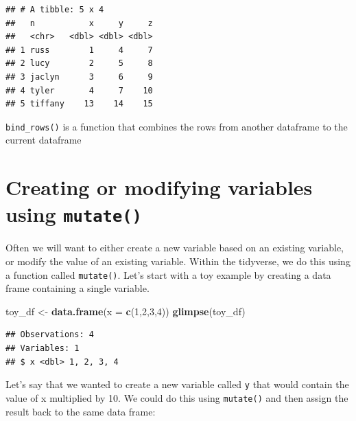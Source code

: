\documentclass[12pt,]{book}
\newenvironment{Shaded}{\begin{snugshade}}{\end{snugshade}}
\newcommand{\CommentTok}[1]{\textcolor[rgb]{0.56,0.35,0.01}{\textit{#1}}}
\newcommand{\DataTypeTok}[1]{\textcolor[rgb]{0.13,0.29,0.53}{#1}}
\newcommand{\DecValTok}[1]{\textcolor[rgb]{0.00,0.00,0.81}{#1}}
\newcommand{\KeywordTok}[1]{\textcolor[rgb]{0.13,0.29,0.53}{\textbf{#1}}}
\newcommand{\NormalTok}[1]{#1}
\newcommand{\OperatorTok}[1]{\textcolor[rgb]{0.81,0.36,0.00}{\textbf{#1}}}
\newcommand{\StringTok}[1]{\textcolor[rgb]{0.31,0.60,0.02}{#1}}
\begin{document}
\begin{verbatim}
## # A tibble: 5 x 4
##   n           x     y     z
##   <chr>   <dbl> <dbl> <dbl>
## 1 russ        1     4     7
## 2 lucy        2     5     8
## 3 jaclyn      3     6     9
## 4 tyler       4     7    10
## 5 tiffany    13    14    15
\end{verbatim}

\texttt{bind\_rows()} is a function that combines the rows from another dataframe to the current dataframe

\hypertarget{creating-or-modifying-variables-using-mutate}{%
\section{\texorpdfstring{Creating or modifying variables using \texttt{mutate()}}{Creating or modifying variables using mutate()}}\label{creating-or-modifying-variables-using-mutate}}

Often we will want to either create a new variable based on an existing variable, or modify the value of an existing variable. Within the tidyverse, we do this using a function called \texttt{mutate()}. Let's start with a toy example by creating a data frame containing a single variable.

\begin{Shaded}
\begin{Highlighting}[]
\NormalTok{toy_df <-}\StringTok{ }\KeywordTok{data.frame}\NormalTok{(}\DataTypeTok{x =} \KeywordTok{c}\NormalTok{(}\DecValTok{1}\NormalTok{,}\DecValTok{2}\NormalTok{,}\DecValTok{3}\NormalTok{,}\DecValTok{4}\NormalTok{))}
\KeywordTok{glimpse}\NormalTok{(toy_df)}
\end{Highlighting}
\end{Shaded}

\begin{verbatim}
## Observations: 4
## Variables: 1
## $ x <dbl> 1, 2, 3, 4
\end{verbatim}

Let's say that we wanted to create a new variable called \texttt{y} that would contain the value of x multiplied by 10. We could do this using \texttt{mutate()} and then assign the result back to the same data frame:

\begin{Shaded}
\end{Shaded}
\end{document}
